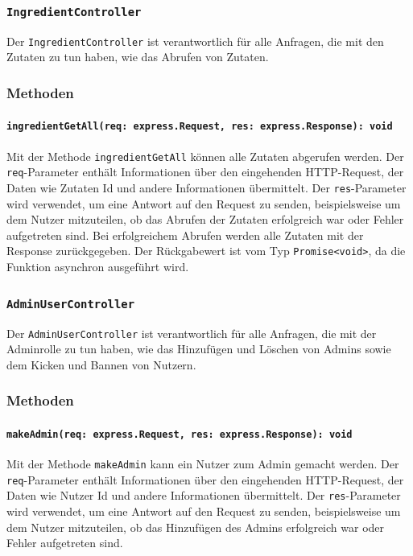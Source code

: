 \documentclass{entwurfsheft}
\begin{document}
\subsubsection{\texttt{IngredientController}}\label{sec:IngredientController}
Der \texttt{IngredientController} ist verantwortlich für alle Anfragen, die mit den Zutaten zu tun haben, wie das Abrufen von Zutaten.
\subsubsection*{Methoden}
\paragraph{\texttt{ingredientGetAll(req: express.Request, res: express.Response): void}}
Mit der Methode \texttt{ingredientGetAll} können alle Zutaten abgerufen werden. Der \texttt{req}-Parameter enthält Informationen über den eingehenden HTTP-Request, der Daten wie Zutaten Id und andere Informationen übermittelt. Der \texttt{res}-Parameter wird verwendet, um eine Antwort auf den Request zu senden, beispielsweise um dem Nutzer mitzuteilen, ob das Abrufen der Zutaten erfolgreich war oder Fehler aufgetreten sind. Bei erfolgreichem Abrufen werden alle Zutaten mit der Response zurückgegeben.
Der Rückgabewert ist vom Typ \texttt{Promise<void>}, da die Funktion asynchron ausgeführt wird.

\subsubsection{\texttt{AdminUserController}}\label{sec:AdminUserController}
Der \texttt{AdminUserController} ist verantwortlich für alle Anfragen, die mit der Adminrolle zu tun haben, wie das Hinzufügen und Löschen von Admins sowie dem Kicken und Bannen von Nutzern.
\subsubsection*{Methoden}
\paragraph{\texttt{makeAdmin(req: express.Request, res: express.Response): void}}
Mit der Methode \texttt{makeAdmin} kann ein Nutzer zum Admin gemacht werden. Der \texttt{req}-Parameter enthält Informationen über den eingehenden HTTP-Request, der Daten wie Nutzer Id und andere Informationen übermittelt. Der \texttt{res}-Parameter wird verwendet, um eine Antwort auf den Request zu senden, beispielsweise um dem Nutzer mitzuteilen, ob das Hinzufügen des Admins erfolgreich war oder Fehler aufgetreten sind.
\end{document}
